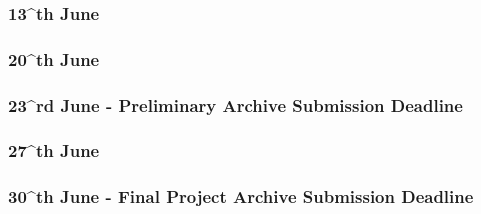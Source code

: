 \subsubsection{13^{th} June}     
\subsubsection{20^{th} June}     
\subsubsection{23^{rd} June - Preliminary Archive Submission Deadline}     
\subsubsection{27^{th} June}     
\subsubsection{30^{th} June - Final Project Archive Submission Deadline}     

